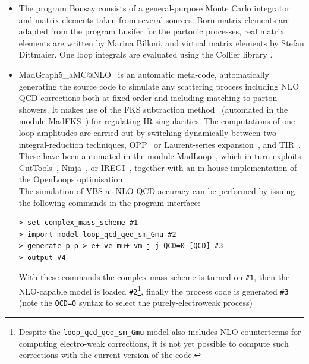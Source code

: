 \begin{itemize}
 \item The program {\sc Bonsay} consists of a general-purpose Monte Carlo integrator
and matrix elements taken from several sources: Born matrix elements are
adapted from the program {\sc Lusifer} \cite{Dittmaier:2002ap} for the partonic
processes, real matrix elements are written by Marina Billoni, and virtual
matrix elements by Stefan Dittmaier.
One loop integrals are evaluated using the {\sc Collier} library
\cite{Denner:2014gla,Denner:2016kdg}.

  \item {\sc MadGraph5\_aMC@NLO}~\cite{Alwall:2014hca} is an automatic meta-code, automatically generating the source code to simulate any scattering process
      including NLO QCD corrections both at fixed order and including matching to parton showers. It makes use of the FKS subtraction method~\cite{Frixione:1995ms,
        Frixione:1997np} (automated in the module {\sc MadFKS}~\cite{Frederix:2009yq,
        Frederix:2016rdc}) for regulating IR singularities. The computations of one-loop amplitudes are carried out by switching dynamically between 
        two integral-reduction techniques, OPP~\cite{Ossola:2006us} or Laurent-series expansion~\cite{Mastrolia:2012bu},
        and TIR~\cite{Passarino:1978jh,Davydychev:1991va,Denner:2005nn}. These have been automated in the module {\sc MadLoop}~\cite{Hirschi:2011pa}, which 
        in turn exploits {\sc CutTools}~\cite{Ossola:2007ax}, {\sc Ninja}~\cite{Peraro:2014cba,
        Hirschi:2016mdz}, or {\sc IREGI}~\cite{ShaoIREGI}, together with an in-house implementation of the {\sc OpenLoops} optimisation~\cite{Cascioli:2011va}.\\
        The simulation of VBS at NLO-QCD accuracy can be performed by issuing the following commands in the program interface:
\begin{verbatim}
> set complex_mass_scheme #1
> import model loop_qcd_qed_sm_Gmu #2
> generate p p > e+ ve mu+ vm j j QCD=0 [QCD] #3
> output #4
\end{verbatim}
  With these commands the complex-mass scheme is turned on {\tt \#1}, then the NLO-capable model is loaded {\tt \#2}\footnote{Despite
            the {\tt loop\_qcd\_qed\_sm\_Gmu} model also includes NLO counterterms for computing electro-weak corrections, it is not yet possible to compute such corrections 
        with the current version of the code.}, finally the process code is generated {\tt \#3} (note the {\tt QCD=0} syntax to select the purely-electroweak process)

\end{itemize}
